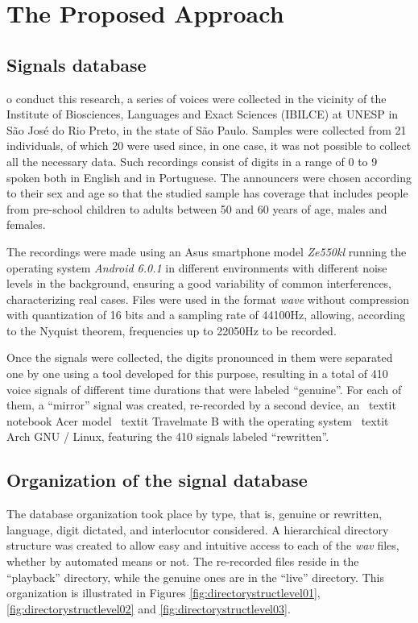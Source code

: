 \section{The Proposed Approach}
	\label{pa}
	\subsection{Signals database}
		\par o conduct this research, a series of voices were collected in the vicinity of the Institute of Biosciences, Languages and Exact Sciences (IBILCE) at UNESP in São José do Rio Preto, in the state of São Paulo. Samples were collected from 21 individuals, of which 20 were used since, in one case, it was not possible to collect all the necessary data. Such recordings consist of digits in a range of 0 to 9 spoken both in English and in Portuguese. The announcers were chosen according to their sex and age so that the studied sample has coverage that includes people from pre-school children to adults between 50 and 60 years of age, males and females.
		
		\par The recordings were made using an Asus smartphone model \textit {Ze550kl} running the operating system \textit {Android 6.0.1} in different environments with different noise levels in the background, ensuring a good variability of common interferences, characterizing real cases. Files were used in the format \textit{wave} without compression with quantization of 16 bits and a sampling rate of 44100Hz, allowing, according to the Nyquist theorem, frequencies up to 22050Hz to be recorded.
		
		\par Once the signals were collected, the digits pronounced in them were separated one by one using a tool developed for this purpose, resulting in a total of 410 voice signals of different time durations that were labeled ``genuine''. For each of them, a ``mirror'' signal was created, re-recorded by a second device, an \ textit {notebook} Acer model \ textit {Travelmate B} with the operating system \ textit {Arch GNU / Linux}, featuring the 410 signals labeled ``rewritten''.
		
	\subsection{Organization of the signal database}
		\par The database organization took place by type, that is, genuine or rewritten, language, digit dictated, and interlocutor considered. A hierarchical directory structure was created to allow easy and intuitive access to each of the \textit {wav} files, whether by automated means or not. The re-recorded files reside in the ``playback'' directory, while the genuine ones are in the ``live'' directory. This organization is illustrated in Figures \ref{fig:directorystructlevel01}, \ref{fig:directorystructlevel02} and \ref{fig:directorystructlevel03}.
		
